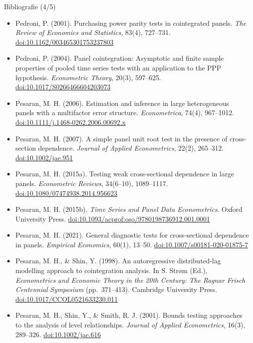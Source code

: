 \begin{frame}{Bibliografie (4/5)}
\itemsize{\tiny}
\begin{itemize}
    \item Pedroni, P. (2001). Purchasing power parity tests in cointegrated panels. \textit{The Review of Economics and Statistics}, 83(4), 727--731. \href{https://doi.org/10.1162/003465301753237803}{doi:10.1162/003465301753237803}
    \item Pedroni, P. (2004). Panel cointegration: Asymptotic and finite sample properties of pooled time series tests with an application to the PPP hypothesis. \textit{Econometric Theory}, 20(3), 597--625. \href{https://doi.org/10.1017/S0266466604203073}{doi:10.1017/S0266466604203073}
    \item Pesaran, M. H. (2006). Estimation and inference in large heterogeneous panels with a multifactor error structure. \textit{Econometrica}, 74(4), 967--1012. \href{https://doi.org/10.1111/j.1468-0262.2006.00692.x}{doi:10.1111/j.1468-0262.2006.00692.x}
    \item Pesaran, M. H. (2007). A simple panel unit root test in the presence of cross-section dependence. \textit{Journal of Applied Econometrics}, 22(2), 265--312. \href{https://doi.org/10.1002/jae.951}{doi:10.1002/jae.951}
    \item Pesaran, M. H. (2015a). Testing weak cross-sectional dependence in large panels. \textit{Econometric Reviews}, 34(6--10), 1089--1117. \href{https://doi.org/10.1080/07474938.2014.956623}{doi:10.1080/07474938.2014.956623}
    \item Pesaran, M. H. (2015b). \textit{Time Series and Panel Data Econometrics}. Oxford University Press. \href{https://doi.org/10.1093/acprof:oso/9780198736912.001.0001}{doi:10.1093/acprof:oso/9780198736912.001.0001}
    \item Pesaran, M. H. (2021). General diagnostic tests for cross-sectional dependence in panels. \textit{Empirical Economics}, 60(1), 13--50. \href{https://doi.org/10.1007/s00181-020-01875-7}{doi:10.1007/s00181-020-01875-7}
    \item Pesaran, M. H., \& Shin, Y. (1998). An autoregressive distributed-lag modelling approach to cointegration analysis. In S. Strøm (Ed.), \textit{Econometrics and Economic Theory in the 20th Century: The Ragnar Frisch Centennial Symposium} (pp.\ 371--413). Cambridge University Press. \href{https://doi.org/10.1017/CCOL0521633230.011}{doi:10.1017/CCOL0521633230.011}
    \item Pesaran, M. H., Shin, Y., \& Smith, R. J. (2001). Bounds testing approaches to the analysis of level relationships. \textit{Journal of Applied Econometrics}, 16(3), 289--326. \href{https://doi.org/10.1002/jae.616}{doi:10.1002/jae.616}

\end{itemize}
\end{frame}
